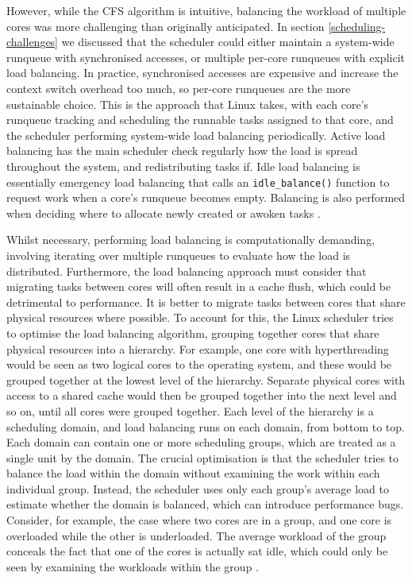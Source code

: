 \documentclass[bsc,frontabs,singlespacing,parskip,deptreport]{infthesis}     %
\begin{document}
However, while the CFS algorithm is intuitive, balancing the workload of multiple cores was more challenging than originally anticipated. In section \ref{scheduling-challenges} we discussed that the scheduler could either maintain a system-wide runqueue with synchronised accesses, or multiple per-core runqueues with explicit load balancing. In practice, synchronised accesses are expensive and increase the context switch overhead too much, so per-core runqueues are the more sustainable choice. This is the approach that Linux takes, with each core's runqueue tracking and scheduling the runnable tasks assigned to that core, and the scheduler performing system-wide load balancing periodically. Active load balancing has the main scheduler check regularly how the load is spread throughout the system, and redistributing tasks if. Idle load balancing is essentially emergency load balancing that calls an \verb|idle_balance()| function to request work when a core's runqueue becomes empty. Balancing is also performed when deciding where to allocate newly created or awoken tasks \cite{seeker}. 

Whilst necessary, performing load balancing is computationally demanding, involving iterating over multiple runqueues to evaluate how the load is distributed. Furthermore, the load balancing approach must consider that migrating tasks between cores will often result in a cache flush, which could be detrimental to performance. It is better to migrate tasks between cores that share physical resources where possible. To account for this, the Linux scheduler tries to optimise the load balancing algorithm, grouping together cores that share physical resources into a hierarchy. For example, one core with hyperthreading would be seen as two logical cores to the operating system, and these would be grouped together at the lowest level of the hierarchy. Separate physical cores with access to a shared cache would then be grouped together into the next level and so on, until all cores were grouped together. Each level of the hierarchy is a scheduling domain, and load balancing runs on each domain, from bottom to top. Each domain can contain one or more scheduling groups, which are treated as a single unit by the domain. The crucial optimisation is that the scheduler tries to balance the load within the domain without examining the work within each individual group. Instead, the scheduler uses only each group's average load to estimate whether the domain is balanced, which can introduce performance bugs. Consider, for example, the case where two cores are in a group, and one core is overloaded while the other is underloaded. The average workload of the group conceals the fact that one of the cores is actually sat idle, which could only be seen by examining the workloads within the group \cite{wasted-cores}.
\end{document}
